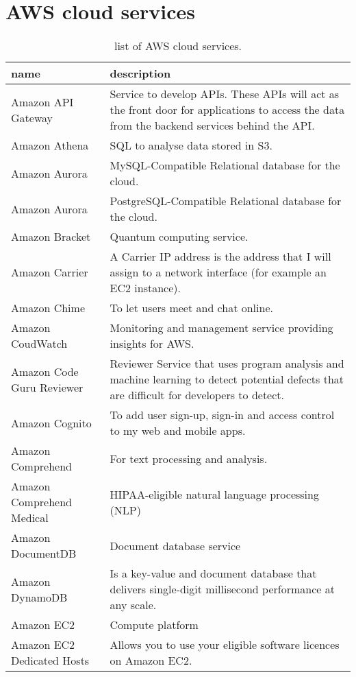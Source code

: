 \documentclass[]{book}
\begin{document}
\section{AWS cloud services}\label{aws-cloud-services}

\begin{table}

\caption{\label{tab:unnamed-chunk-59}list of AWS cloud services.}
\centering
\begin{tabular}[t]{ll}
\toprule
name & description\\
\midrule
Amazon API Gateway & Service to develop APIs. These APIs will act as the front door for applications to access the data from the backend services behind the API.\\
Amazon Athena & SQL to analyse data stored in S3.\\
Amazon Aurora & MySQL-Compatible    Relational database for the cloud.\\
Amazon Aurora & PostgreSQL-Compatible   Relational database for the cloud.\\
Amazon Bracket & Quantum computing service.\\
\addlinespace
Amazon Carrier & A Carrier IP address is the address that I will assign to a network interface (for example an EC2 instance).\\
Amazon Chime & To let users meet and chat online.\\
Amazon CoudWatch & Monitoring and management service providing insights for AWS.\\
Amazon Code Guru Reviewer & Reviewer    Service that uses program analysis and machine learning to detect potential defects that are difficult for developers to detect.\\
Amazon Cognito & To add user sign-up, sign-in and access control to my web and mobile apps.\\
\addlinespace
Amazon Comprehend & For text processing and analysis.\\
Amazon Comprehend Medical & HIPAA-eligible natural language processing (NLP)\\
Amazon DocumentDB & Document database service\\
Amazon DynamoDB & Is a key-value and document database that delivers single-digit millisecond performance at any scale.\\
Amazon EC2 & Compute platform\\
\addlinespace
Amazon EC2 Dedicated Hosts & Allows you to use your eligible software licences on Amazon EC2.\\

\end{tabular}
\end{table}
\end{document}
